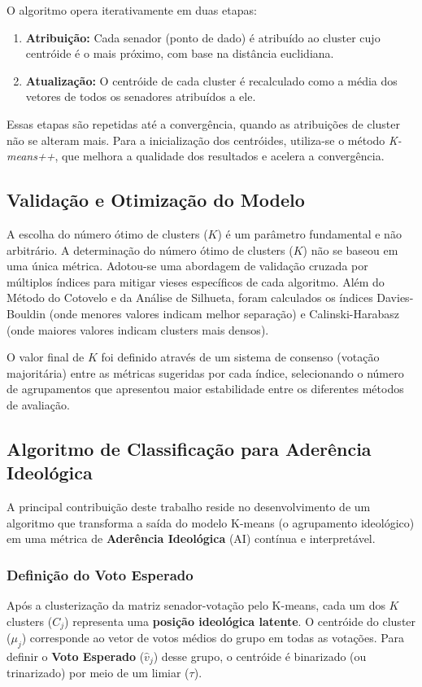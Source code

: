 \documentclass[conference]{IEEEtran}
\begin{document}
O algoritmo opera iterativamente em duas etapas:
\begin{enumerate}
    \item \textbf{Atribuição:} Cada senador (ponto de dado) é atribuído ao cluster cujo centróide é o mais próximo, com base na distância euclidiana.
    \item \textbf{Atualização:} O centróide de cada cluster é recalculado como a média dos vetores de todos os senadores atribuídos a ele.
\end{enumerate}
Essas etapas são repetidas até a convergência, quando as atribuições de cluster não se alteram mais. Para a inicialização dos centróides, utiliza-se o método \textit{K-means++}, que melhora a qualidade dos resultados e acelera a convergência.

\subsection{Validação e Otimização do Modelo}
A escolha do número ótimo de clusters ($K$) é um parâmetro fundamental e não arbitrário.
A determinação do número ótimo de clusters ($K$) não se baseou em uma única métrica. Adotou-se uma abordagem de validação cruzada por múltiplos índices para mitigar vieses específicos de cada algoritmo. Além do Método do Cotovelo e da Análise de Silhueta, foram calculados os índices Davies-Bouldin (onde menores valores indicam melhor separação) e Calinski-Harabasz (onde maiores valores indicam clusters mais densos).

O valor final de $K$ foi definido através de um sistema de consenso (votação majoritária) entre as métricas sugeridas por cada índice, selecionando o número de agrupamentos que apresentou maior estabilidade entre os diferentes métodos de avaliação.

\subsection{Algoritmo de Classificação para Aderência Ideológica}
A principal contribuição deste trabalho reside no desenvolvimento de um algoritmo que transforma a saída do modelo K-means (o agrupamento ideológico) em uma métrica de \textbf{Aderência Ideológica} ($\text{AI}$) contínua e interpretável.

\subsubsection{Definição do Voto Esperado}
Após a clusterização da matriz senador-votação pelo K-means, cada um dos $K$ clusters ($C_j$) representa uma \textbf{posição ideológica latente}. O centróide do cluster ($\mu_j$) corresponde ao vetor de votos médios do grupo em todas as votações. Para definir o \textbf{Voto Esperado} ($\hat{v}_{j}$) desse grupo, o centróide é binarizado (ou trinarizado) por meio de um limiar ($\tau$).
\end{document}
